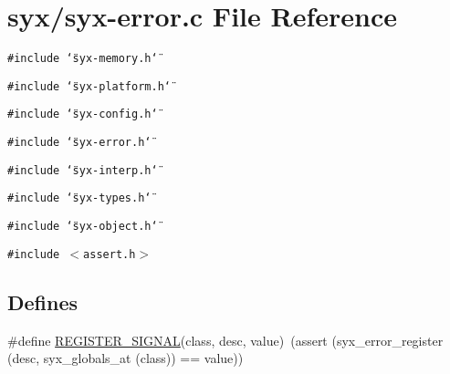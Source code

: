 \hypertarget{syx-error_8c}{
\section{syx/syx-error.c File Reference}
\label{syx-error_8c}
}
{\tt \#include \char`\"{}syx-memory.h\char`\"{}}\par
{\tt \#include \char`\"{}syx-platform.h\char`\"{}}\par
{\tt \#include \char`\"{}syx-config.h\char`\"{}}\par
{\tt \#include \char`\"{}syx-error.h\char`\"{}}\par
{\tt \#include \char`\"{}syx-interp.h\char`\"{}}\par
{\tt \#include \char`\"{}syx-types.h\char`\"{}}\par
{\tt \#include \char`\"{}syx-object.h\char`\"{}}\par
{\tt \#include $<$assert.h$>$}\par
\subsection*{Defines}
\begin{CompactItemize}
\item 
\#define \hyperlink{syx-error_8c_aa227e7b8fc45d4da294a2477b2caafd}{REGISTER\_\-SIGNAL}(class, desc, value)~(assert (syx\_\-error\_\-register (desc, syx\_\-globals\_\-at (class)) == value))
\end{CompactItemize}
